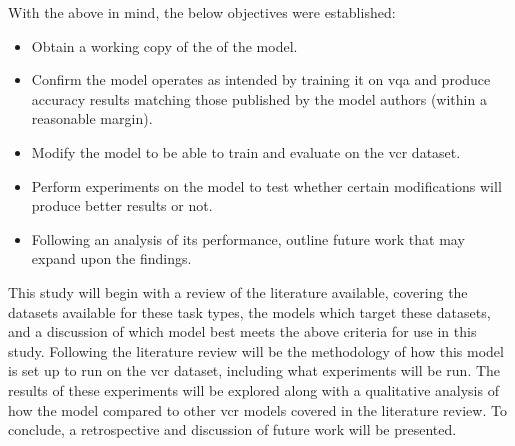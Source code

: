 With the above in mind, the below objectives were established:

\begin{itemize}\label{list:list_of_objectives}
    \item Obtain a working copy of the of the model.
    \item Confirm the model operates as intended by training it on \gls{vqa} and produce accuracy results matching those published by the model authors (within a reasonable margin).
    \item Modify the model to be able to train and evaluate on the \gls{vcr} dataset.
    \item Perform experiments on the model to test whether certain modifications will produce better results or not.
    \item Following an analysis of its performance, outline future work that may expand upon the findings.
\end{itemize}

This study will begin with a review of the literature available, covering the datasets available for these task types, the models which target these datasets, and a discussion of which model best meets the above criteria for use in this study.
Following the literature review will be the methodology of how this model is set up to run on the \gls{vcr} dataset, including what experiments will be run.
The results of these experiments will be explored along with a qualitative analysis of how the model compared to other \gls{vcr} models covered in the literature review.
To conclude, a retrospective and discussion of future work will be presented.
